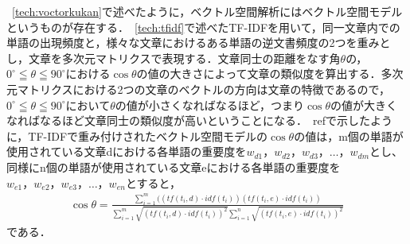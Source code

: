 ~\ref{tech:voctorkukan}で述べたように，ベクトル空間解析にはベクトル空間モデルというものが存在する．~\ref{tech:tfidf}で述べたTF-IDFを用いて，同一文章内での単語の出現頻度と，様々な文章におけるある単語の逆文書頻度の2つを重みとし，文章を多次元マトリクスで表現する．文章同士の距離をなす角$ \theta $の，$ 0^\circ \leqq \theta \leqq 90^\circ $における$ \cos \theta $の値の大きさによって文章の類似度を算出する．多次元マトリクスにおける2つの文章のベクトルの方向は文章の特徴であるので，$ 0^\circ \leqq \theta \leqq 90^\circ $において$ \theta $の値が小さくなればなるほど，つまり$ \cos \theta $の値が大きくなればなるほど文章同士の類似度が高いということになる．~ref{}で示したように，TF-IDFで重み付けされたベクトル空間モデルの$ \cos \theta $の値は，m個の単語が使用されている文章dにおける各単語の重要度を$ w_{d1}，w_{d2}，w_{d3}， \ldots ，w_{dm} $とし、同様にn個の単語が使用されている文章eにおける各単語の重要度を$ w_{e1}，w_{e2}，w_{e3}， \ldots ，w_{en} $とすると，\\
\begin{align}
\cos \theta = \frac{ \sum_{i=1}^{m} ((tf(t_{i},d) \cdot idf(t_{i}))(tf(t_{i},e) \cdot idf(t_{i}))}{\sum_{i=1}^{m} \sqrt{(tf(t_{i},d) \cdot idf(t_{i}))^2} \sum_{i=1}^{n} \sqrt{(tf(t_{i},e) \cdot idf(t_{i}))^2}} \nonumber
\end{align}
である．


